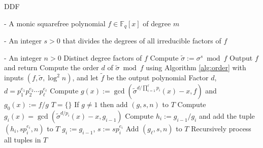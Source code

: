 \documentclass{article}
\theoremstyle{plain}
\theoremstyle{definition}
\newcommand{\algbox}[1]{
	\begin{tcolorbox}[width = 0.8\textwidth, colback = white, arc = 2pt, boxrule = 0.5pt] 
		#1 
	\end{tcolorbox}
}
\def\F{\ensuremath{\mathbb{F}}}
\begin{document}
\begin{algorithm}[t]
	\caption{DDF}
	\label{alg:ddf}
	\centering
	\algbox{
	\begin{algorithmic}[1]
		\Require 
		\item[-] A monic squarefree polynomial $f \in \F_q[x]$ of degree $m$
		\item[-] An integer $s > 0$ that divides the degrees of all irreducible factors of $f$
		\item[-] An integer $n > 0$
		\Ensure Distinct degree factors of $f$
		\State\label{step:sigma-s}Compute $\tilde{\sigma} := \sigma^s \bmod f$
		\If {$\tilde{\sigma} = $ id}
			\State Output $f$ and return
		\EndIf
		\State\label{step:order}Compute the order $d$ of $\tilde{\sigma} \bmod f$ using Algorithm 
		\ref{alg:order} with inputs $(f, \tilde{\sigma}, \log^2n)$, and let $\tilde{f}$ be the 
		output polynomial
		\State\label{step:factor-d}Factor $d$, $d = p_1^{e_1} p_2^{e_2} \cdots p_\ell^{e_\ell}$
		\State\label{step:gcd-first}Compute $g(x) := \gcd(\tilde{\sigma}^{d / \prod_{i = 1}^\ell 
		p_i}(x) - x, f)$ and $g_0(x) := f / g$
		\State $T = \{\}$
		\State If $g \ne 1$ then add $(g, s, n)$ to $T$
		\For {$i = 1$ to $\ell$ }\label{step:for-ddf}
			\State Compute $g_i(x) = \gcd(\tilde{\sigma}^{d / p_i}(x) - x, g_{i - 1})$
			\If {$g_i \ne 1$} 
				\State Compute $h_i := g_{i - 1} / g_i$ and add the tuple $(h_i, sp_i^{e_i}, n)$ to 
				$T$
			\Else
				\State $g_i := g_{i - 1}$, $s := sp_i^{e_i}$
			\EndIf
		\EndFor
		\State Add $(g_\ell, s, n)$ to $T$
		\State Recursively process all tuples in $T$
	\end{algorithmic}}
\end{algorithm}
\end{document}
